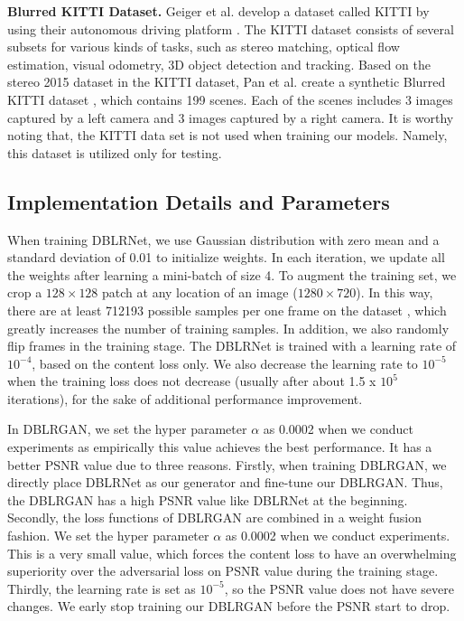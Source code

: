 \documentclass[journal]{IEEEtran}
\begin{document}
\textbf{Blurred KITTI Dataset.} Geiger et al. develop a dataset called KITTI by using their autonomous driving platform \cite{geiger2013vision}. The KITTI dataset consists of several subsets for various kinds of tasks, such as stereo matching, optical flow estimation, visual odometry, 3D object detection and tracking. Based on the stereo 2015 dataset in the KITTI dataset, Pan et al. create a synthetic Blurred KITTI dataset \cite{pan2017simultaneous}, which contains 199 scenes. Each of the scenes includes 3 images captured by a left camera and 3 images captured by a right camera. It is worthy noting that, the KITTI data set is not used when training our models. Namely, this dataset is utilized only for testing.

\subsection{Implementation Details and Parameters}
When training DBLRNet, we use Gaussian distribution with zero mean and a standard deviation of 0.01 to initialize weights. In each iteration, we update all the weights after learning a mini-batch of size 4. To augment the training set, we crop a $128 \times 128$ patch at any location of an image ($1280 \times 720$). In this way, there are at least 712193 possible samples per one frame on the dataset \cite{su2016deep}, which greatly increases the number of training samples. In addition, we also randomly flip frames in the training stage. The DBLRNet is trained with a learning rate of $10^{-4}$, based on the content loss only. We also decrease the learning rate to $10^{-5}$ when the training loss does not decrease (usually after about 1.5 x $10^{5}$ iterations), for the sake of additional performance improvement.

In DBLRGAN, we set the hyper parameter $\alpha$ as 0.0002 when we conduct experiments as empirically this value achieves the best performance. It has a better PSNR value due to three reasons. Firstly, when training DBLRGAN, we directly place DBLRNet as our generator and fine-tune our DBLRGAN. Thus, the DBLRGAN has a high PSNR value like DBLRNet at the beginning. Secondly, the loss functions of DBLRGAN are combined in a weight fusion fashion. We set the hyper parameter $\alpha$ as 0.0002 when we conduct experiments. This is a very small value, which forces the content loss to have an overwhelming superiority over the adversarial loss on PSNR value during the training stage. Thirdly, the learning rate is set as $10^{-5}$, so the PSNR value does not have severe changes. We early stop training our DBLRGAN before the PSNR start to drop.
\end{document}
